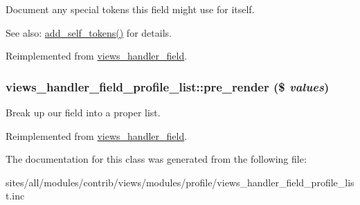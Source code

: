 Document any special tokens this field might use for itself.

\begin{Desc}
\item[See also:]\hyperlink{classviews__handler__field__profile__list_411c5238debac02e7cb3f582f7cd8e9f}{add\_\-self\_\-tokens()} for details. \end{Desc}


Reimplemented from \hyperlink{classviews__handler__field_e33446d1059f13fbfb06a37da04d320e}{views\_\-handler\_\-field}.\hypertarget{classviews__handler__field__profile__list_8c8d3cb39336f354e35c0b2e5afd25aa}{
\subsubsection[{pre\_\-render}]{\setlength{\rightskip}{0pt plus 5cm}views\_\-handler\_\-field\_\-profile\_\-list::pre\_\-render (\$ {\em values})}}
\label{classviews__handler__field__profile__list_8c8d3cb39336f354e35c0b2e5afd25aa}


Break up our field into a proper list. 

Reimplemented from \hyperlink{classviews__handler__field_e30a1d9c98c62ae40c90b938e09cd0ec}{views\_\-handler\_\-field}.

The documentation for this class was generated from the following file:\begin{CompactItemize}
\item 
sites/all/modules/contrib/views/modules/profile/views\_\-handler\_\-field\_\-profile\_\-list.inc\end{CompactItemize}
